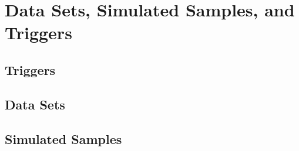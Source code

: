 \section{Data Sets, Simulated Samples, and Triggers}
\label{sec:datasets_simul_trig}

\subsection{Triggers}
\label{sec:trig}


\subsection{Data Sets}


\subsection{Simulated Samples}
\label{sec:sim_samples}
